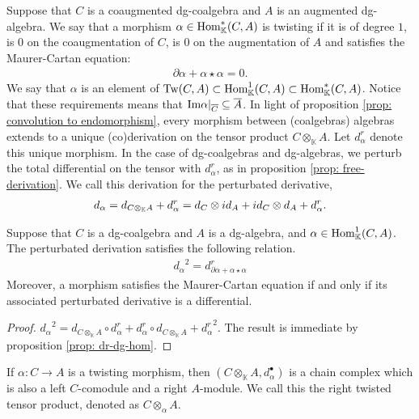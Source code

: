 \documentclass[../thesis.tex]{subfiles}
\begin{document}
            Suppose that $C$ is a coaugmented dg-coalgebra and $A$ is an augmented dg-algebra. We say that a morphism $\alpha\in \tt{Hom}_\mathbb{K}^*(C,A)$ is twisting if it is of degree $1$, is $0$ on the coaugmentation of $C$, is $0$ on the augmentation of $A$ and satisfies the Maurer-Cartan equation:
            \begin{align*}
                \partial\alpha + \alpha\star\alpha = 0\text{.}
            \end{align*}
            We say that $\alpha$ is an element of $\tt{Tw}(C,A)\subset \tt{Hom}_\mathbb{K}^{1}(C,A)\subset \tt{Hom}_\mathbb{K}^*(C,A)$. Notice that these requirements means that $\tt{Im}\alpha |_{\overline{C}} \subseteq \overline{A}$. In light of proposition \ref{prop: convolution to endomorphism}, every morphism between (coalgebras) algebras extends to a unique (co)derivation on the tensor product $C\otimes_\mathbb{K}A$. Let $d_\alpha^r$ denote this unique morphism. In the case of dg-coalgebras and dg-algebras, we perturb the total differential on the tensor with $d_\alpha^r$, as in proposition \ref{prop: free-derivation}. We call this derivation for the perturbated derivative,
            \begin{align*}
                d_\alpha = d_{C\otimes_\mathbb{K}A} + d_\alpha^r = d_C\otimes id_A + id_C\otimes d_A + d_\alpha^r\tt{.}
            \end{align*}
            \begin{proposition}\label{prop: twisted-differential}
                Suppose that $C$ is a dg-coalgebra and $A$ is a dg-algebra, and $\alpha\in \tt{Hom}_\mathbb{K}^{1}(C,A)$. The perturbated derivation satisfies the following relation.
                \begin{align*}
                    {d_\alpha}^2 = d^r_{\partial \alpha + \alpha\star\alpha}
                \end{align*}
                Moreover, a morphism satisfies the Maurer-Cartan equation if and only if its associated perturbated derivative is a differential.
            \end{proposition}

            \begin{proof}
                ${d_\alpha}^2 = d_{C\otimes_\mathbb{K}A} \circ d_\alpha^r + d_\alpha^r \circ d_{C\otimes_\mathbb{K}A} + {d_\alpha^r}^2$. The result is immediate by proposition \ref{prop: dr-dg-hom}.
            \end{proof}

            \begin{corollary}
                If $\alpha: C\rightarrow A$ is a twisting morphism, then $(C\otimes_\mathbb{K}A, d_\alpha^\bullet)$ is a chain complex which is also a left $C$-comodule and a right $A$-module. We call this the right twisted tensor product, denoted as $C\otimes_\alpha A$.
            \end{corollary}
\end{document}

